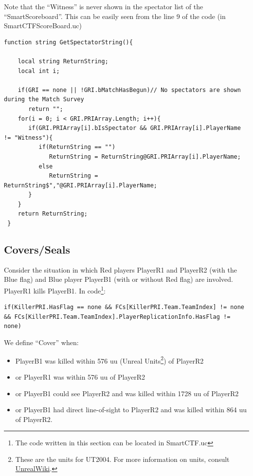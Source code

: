 \documentclass{article}
\begin{document}
Note that the ``Witness'' is never shown in the spectator list of the ``SmartScoreboard''.  This can be easily seen from the line 9 of the code (in {\color{Orange}SmartCTFScoreBoard.uc})

\begin{lstlisting}[frame=single]
  function string GetSpectatorString(){

    local string ReturnString;
    local int i;

    if(GRI == none || !GRI.bMatchHasBegun)// No spectators are shown during the Match Survey
       return "";
    for(i = 0; i < GRI.PRIArray.Length; i++){
       if(GRI.PRIArray[i].bIsSpectator && GRI.PRIArray[i].PlayerName != "Witness"){
          if(ReturnString == "")
             ReturnString = ReturnString@GRI.PRIArray[i].PlayerName;
          else
             ReturnString = ReturnString$","@GRI.PRIArray[i].PlayerName;
       }
    }
    return ReturnString;
 }
\end{lstlisting}

\subsection{Covers/Seals}
\label{Sec:coverseal}
Consider the situation in which Red players PlayerR1 and PlayerR2 (with the Blue flag) and Blue player PlayerB1 (with or without Red flag) are involved.  PlayerR1 kills PlayerB1.  In code\footnote{The code written in this section can be located in {\color{Orange}SmartCTF.uc}}:

\begin{lstlisting}[frame=single]
  if(KillerPRI.HasFlag == none && FCs[KillerPRI.Team.TeamIndex] != none && FCs[KillerPRI.Team.TeamIndex].PlayerReplicationInfo.HasFlag != none)
\end{lstlisting}

We define ``Cover'' when: 
\begin{itemize}
\item PlayerB1 was killed within 576 uu (Unreal Units\footnote{These are the units for UT2004.  For more information on units, consult \href{https://wiki.beyondunreal.com/Unreal_Unit}{{\color{Blue}UnrealWiki}}.}) of PlayerR2
\item or PlayerR1 was within 576 uu of PlayerR2
\item or PlayerB1 could see PlayerR2 and was killed within 1728 uu of PlayerR2
\item or PlayerB1 had direct line-of-sight to PlayerR2 and was killed within 864 uu of PlayerR2.
\end{itemize}
\end{document}
